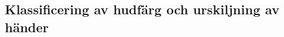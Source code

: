 \documentclass[../rapport_MVEX01-11-05]{subfiles}
\begin{document}
\subsection{Klassificering av hudfärg och urskiljning av händer}
\end{document}
